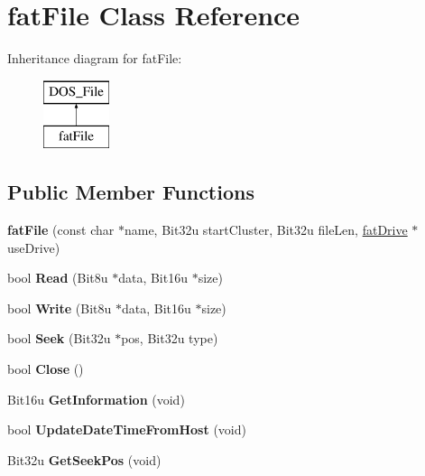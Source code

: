 \hypertarget{classfatFile}{\section{fat\-File Class Reference}
\label{classfatFile}
}
Inheritance diagram for fat\-File\-:\begin{figure}[H]
\begin{center}
\leavevmode
\includegraphics[height=2.000000cm]{classfatFile}
\end{center}
\end{figure}
\subsection*{Public Member Functions}
\begin{DoxyCompactItemize}
\item 
\hypertarget{classfatFile_a707d8a2cc98be6e70f191eeca63b12bc}{{\bfseries fat\-File} (const char $\ast$name, Bit32u start\-Cluster, Bit32u file\-Len, \hyperlink{classfatDrive}{fat\-Drive} $\ast$use\-Drive)}\label{classfatFile_a707d8a2cc98be6e70f191eeca63b12bc}

\item 
\hypertarget{classfatFile_a17397bf2de02a0f9dec751d705f2003e}{bool {\bfseries Read} (Bit8u $\ast$data, Bit16u $\ast$size)}\label{classfatFile_a17397bf2de02a0f9dec751d705f2003e}

\item 
\hypertarget{classfatFile_a1138e4bf6269fdfe38b620fdf40616c2}{bool {\bfseries Write} (Bit8u $\ast$data, Bit16u $\ast$size)}\label{classfatFile_a1138e4bf6269fdfe38b620fdf40616c2}

\item 
\hypertarget{classfatFile_a9c778000be1ecb549b792d46acd70aae}{bool {\bfseries Seek} (Bit32u $\ast$pos, Bit32u type)}\label{classfatFile_a9c778000be1ecb549b792d46acd70aae}

\item 
\hypertarget{classfatFile_a19fc793fd59386b935bdb92b27419089}{bool {\bfseries Close} ()}\label{classfatFile_a19fc793fd59386b935bdb92b27419089}

\item 
\hypertarget{classfatFile_a6fe1adbe5bc4c82a888fd96aa719c4de}{Bit16u {\bfseries Get\-Information} (void)}\label{classfatFile_a6fe1adbe5bc4c82a888fd96aa719c4de}

\item 
\hypertarget{classfatFile_a8bec49bbadaf2ee88e2a5cf65499f2e8}{bool {\bfseries Update\-Date\-Time\-From\-Host} (void)}\label{classfatFile_a8bec49bbadaf2ee88e2a5cf65499f2e8}

\item 
\hypertarget{classfatFile_a071f47d13150ce99c7a14aee01808322}{Bit32u {\bfseries Get\-Seek\-Pos} (void)}\label{classfatFile_a071f47d13150ce99c7a14aee01808322}

\end{DoxyCompactItemize}
